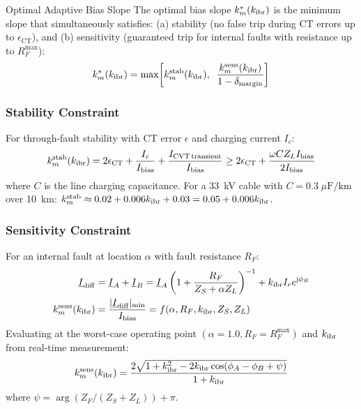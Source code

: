 \begin{thesisdef}{Optimal Adaptive Bias Slope}
The optimal bias slope $k_m^\ast(k_{\mathrm{ibr}})$ is the minimum slope that
simultaneously satisfies:
(a) stability (no false trip during CT errors up to $\epsilon_\mathrm{CT}$), and
(b) sensitivity (guaranteed trip for internal faults with resistance up
to $R_F^\mathrm{max}$):
\begin{equation}
  k_m^\ast(k_{\mathrm{ibr}}) = \max\!\left[k_m^\mathrm{stab}(k_{\mathrm{ibr}}),\;\;
                              \frac{k_m^\mathrm{sens}(k_{\mathrm{ibr}})}{1 - \delta_\mathrm{margin}}\right]
  \label{eq:ch4_km_star}
\end{equation}
\end{thesisdef}

\subsubsection{Stability Constraint}

For through-fault stability with CT error $\epsilon$ and
charging current $I_c$:
\begin{equation}
  k_m^\mathrm{stab}(k_{\mathrm{ibr}}) = 2\epsilon_\mathrm{CT}
    + \frac{I_c}{I_\mathrm{bias}} + \frac{I_\mathrm{CVT\,transient}}{I_\mathrm{bias}}
    \geq 2\epsilon_\mathrm{CT} + \frac{\omega C Z_L I_\mathrm{bias}}{2I_\mathrm{bias}}
  \label{eq:ch4_km_stab}
\end{equation}
where $C$ is the line charging capacitance. For a 33~kV cable with
$C = 0.3\;\mu\mathrm{F/km}$ over 10~km:
$k_m^\mathrm{stab} \approx 0.02 + 0.006k_{\mathrm{ibr}} + 0.03 = 0.05 + 0.006k_{\mathrm{ibr}}$.

\subsubsection{Sensitivity Constraint}

For an internal fault at location $\alpha$ with fault resistance $R_F$:
\begin{align}
  \underline{I}_\mathrm{diff} &= \underline{I}_A + \underline{I}_B
  = \underline{I}_A\left(1 + \frac{R_F}{Z_S + \alpha Z_L}\right)^{-1}
    + k_{\mathrm{ibr}} I_r e^{\mathrm{j}\phi_B}
  \label{eq:ch4_idiff_rf} \\
  k_m^\mathrm{sens}(k_{\mathrm{ibr}}) &=
  \frac{|\underline{I}_\mathrm{diff}|_{\min}}{I_\mathrm{bias}}
  = f(\alpha, R_F, k_{\mathrm{ibr}}, Z_S, Z_L)
  \label{eq:ch4_km_sens}
\end{align}
Evaluating at the worst-case operating point $(\alpha = 1.0, R_F = R_F^\mathrm{max})$
and $k_{\mathrm{ibr}}$ from real-time measurement:
\begin{equation}
  k_m^\mathrm{sens}(k_{\mathrm{ibr}}) = \frac{2\sqrt{1 + k_{\mathrm{ibr}}^2
    - 2k_{\mathrm{ibr}}\cos(\phi_A - \phi_B + \psi)}}{1 + k_{\mathrm{ibr}}}
  \label{eq:ch4_km_sens2}
\end{equation}
where $\psi = \arg(Z_F/(Z_S + Z_L)) + \pi$.

